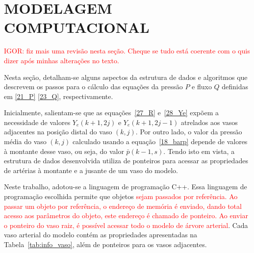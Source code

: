 \documentclass[
        english,			
        brazil			        %
        ,<...>]{abntbibufjf}
\begin{document}
\section{MODELAGEM COMPUTACIONAL}
\label{sec:algoritmo}
\textcolor{red}{IGOR: fiz mais uma revisão nesta seção. Cheque se tudo está coerente com o quis dizer após minhas alterações no texto.}

Nesta seção, detalham-se alguns aspectos da estrutura de dados e algoritmos que descrevem os passos para o cálculo das equações da pressão $P$ e fluxo $Q$ definidas em \eqref{21_P} \eqref{23_Q}, respectivamente.

Inicialmente, salientam-se que as equações~\eqref{27_R} e~\eqref{28_Ye} expõem a necessidade de valores $Y_e(k+1,2j)$ e $Y_e(k+1,2j-1)$ atrelados aos vasos adjacentes na posição distal do vaso $(k,j)$. Por outro lado, o valor da pressão média do vaso $(k,j)$ calculado usando a equação~\eqref{18_barp} depende de valores  à montante desse vaso, ou seja, do valor $\bar{p}(k-1,s)$. Tendo isto em vista, a estrutura de dados desenvolvida utiliza de ponteiros para acessar as propriedades de artérias à montante e a jusante de um vaso do modelo.

Neste trabalho, adotou-se a linguagem de programação C++. Essa linguagem de programação escolhida permite que objetos \textcolor{red}{sejam passados por referência. Ao passar um objeto por referência, o endereço de memória é enviado, dando total acesso aos parâmetros do objeto, este endereço é chamado de ponteiro. Ao enviar o ponteiro do vaso raiz, é possível acessar todo o modelo de árvore arterial}. Cada vaso arterial do modelo contém as propriedades apresentadas na Tabela~\ref{tab:info_vaso}, além de ponteiros para os vasos adjacentes. 
\end{document}
